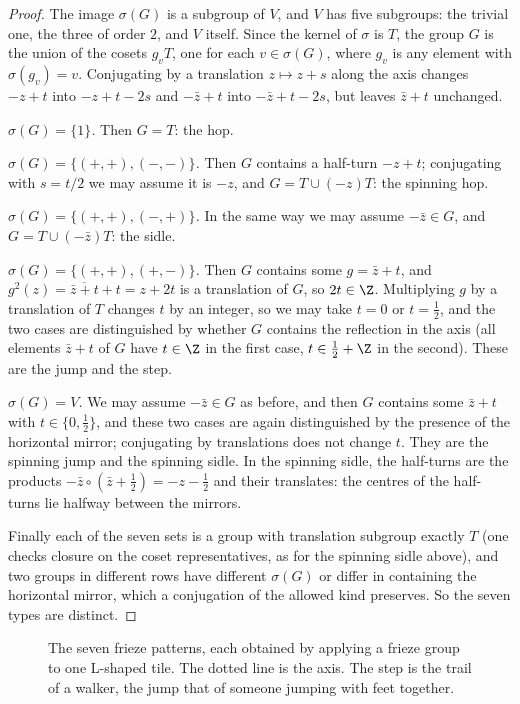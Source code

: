 \begin{proof}
The image $\sigma(G)$ is a subgroup of $V$, and $V$ has five subgroups: the trivial one, the three of order $2$, and $V$ itself. Since the
kernel of $\sigma$ is $T$, the group $G$ is the union of the cosets $g_vT$, one for each $v\in\sigma(G)$, where $g_v$ is any element with
$\sigma(g_v)=v$. Conjugating by a translation $z\mapsto z+s$ along the axis changes $-z+t$ into $-z+t-2s$ and $-\bar z+t$ into
$-\bar z+t-2s$, but leaves $\bar z+t$ unchanged.

\emph{$\sigma(G)=\{1\}$.} Then $G=T$: the hop.

\emph{$\sigma(G)=\{(+,+),(-,-)\}$.} Then $G$ contains a half-turn $-z+t$; conjugating with $s=t/2$ we may assume it is $-z$, and
$G=T\cup(-z)T$: the spinning hop.

\emph{$\sigma(G)=\{(+,+),(-,+)\}$.} In the same way we may assume $-\bar z\in G$, and $G=T\cup(-\bar z)T$: the sidle.

\emph{$\sigma(G)=\{(+,+),(+,-)\}$.} Then $G$ contains some $g=\bar z+t$, and $g^2(z)=\overline{\bar z+t}+t=z+2t$ is a translation of $G$, so
$2t\in\Z$. Multiplying $g$ by a translation of $T$ changes $t$ by an integer, so we may take $t=0$ or $t=\frac12$, and the two cases
are distinguished by whether $G$ contains the reflection in the axis (all elements $\bar z+t$ of $G$ have $t\in\Z$ in the first case,
$t\in\frac12+\Z$ in the second). These are the jump and the step.

\emph{$\sigma(G)=V$.} We may assume $-\bar z\in G$ as before, and then $G$ contains some $\bar z+t$ with $t\in\{0,\frac12\}$, and these two
cases are again distinguished by the presence of the horizontal mirror; conjugating by translations does not change $t$. They are the
spinning jump and the spinning sidle. In the spinning sidle, the half-turns are the products $-\bar z\circ(\bar z+\frac12)=-z-\frac12$
and their translates: the centres of the half-turns lie halfway between the mirrors.

Finally each of the seven sets is a group with translation subgroup exactly $T$ (one checks closure on the coset representatives,
as for the spinning sidle above), and two groups in different rows have different $\sigma(G)$ or differ in containing the horizontal
mirror, which a conjugation of the allowed kind preserves. So the seven types are distinct.
\end{proof}

\begin{figure}[ht]
\centering
{}
\caption{The seven frieze patterns, each obtained by applying a frieze group to one L-shaped tile. The dotted line is the axis. The
step is the trail of a walker, the jump that of someone jumping with feet together.}
\label{fig:friezes}
\end{figure}


